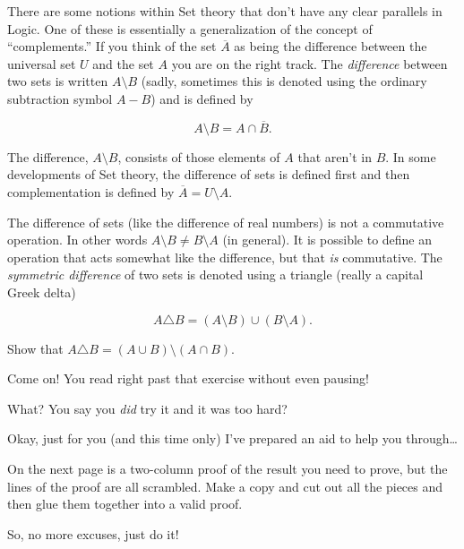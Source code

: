 There are some notions within Set theory that don't have any clear
parallels in Logic.  One of these is essentially a generalization 
of the concept of ``complements.''   If you think of the set $\overline{A}$
as being the difference between the universal set $U$ and the set $A$
you are on the right track.  The 
\emph{difference} between two sets is written 
$A \setminus B$ (sadly, sometimes this is denoted using the ordinary 
subtraction symbol $A-B$) and is defined by

\[   A \setminus B = A \cap \overline{B}. \]

\noindent The difference, $A \setminus B$, consists of those elements of $A$ that aren't in $B$.  In some developments of Set theory, the difference of sets is 
defined first and then complementation is defined by $\overline{A} = U \setminus A$.  

The difference of sets (like the difference of real numbers) is not a 
commutative operation.  In other words $A \setminus B \neq B \setminus A$ 
(in general).  It is possible to define an operation that acts somewhat 
like the difference, but that \emph{is} commutative.  The 
\emph{symmetric difference} 
of two sets is denoted using a 
triangle (really a capital Greek delta)

\[ A \triangle B = (A \setminus B) \cup (B\setminus A). \]

\begin{exer}
Show that  $A \triangle B = (A \cup B) \setminus (A \cap B)$.
\end{exer}

Come on!  You read right past that exercise without even pausing!

What?  You say you \emph{did} try it and it was too hard?

Okay, just for you (and this time only) I've prepared an aid to
help you through\ldots

On the next page is a two-column proof of the result you need to 
prove, but the lines of the proof are all scrambled.
Make a copy and cut out all the pieces and then glue them together
into a valid proof.

So, no more excuses, just do it!

\newpage




